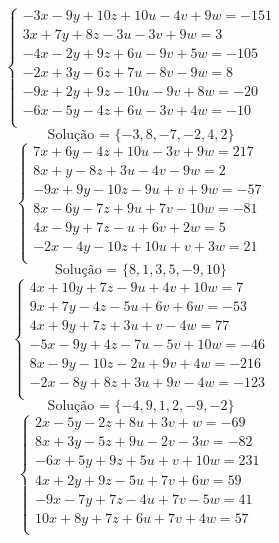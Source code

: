 \documentclass[12pt,oneside,a4paper]{article}
\begin{document}
\vspace{\baselineskip}
\begin{equation*}
\begin{cases}
-3x-9y+10z+10u-4v+9w=-151 \\
3x+7y+8z-3u-3v+9w=3 \\
-4x-2y+9z+6u-9v+5w=-105 \\
-2x+3y-6z+7u-8v-9w=8 \\
-9x+2y+9z-10u-9v+8w=-20 \\
-6x-5y-4z+6u-3v+4w=-10 \\
\end{cases}
\end{equation*}
\begin{equation*}
\text{Solução = }\{-3,8,-7,-2,4,2\}
\end{equation*}
\vspace{\baselineskip}
\begin{equation*}
\begin{cases}
7x+6y-4z+10u-3v+9w=217 \\
8x+y-8z+3u-4v-9w=2 \\
-9x+9y-10z-9u+v+9w=-57 \\
8x-6y-7z+9u+7v-10w=-81 \\
4x-9y+7z-u+6v+2w=5 \\
-2x-4y-10z+10u+v+3w=21 \\
\end{cases}
\end{equation*}
\begin{equation*}
\text{Solução = }\{8,1,3,5,-9,10\}
\end{equation*}
\vspace{\baselineskip}
\begin{equation*}
\begin{cases}
4x+10y+7z-9u+4v+10w=7 \\
9x+7y-4z-5u+6v+6w=-53 \\
4x+9y+7z+3u+v-4w=77 \\
-5x-9y+4z-7u-5v+10w=-46 \\
8x-9y-10z-2u+9v+4w=-216 \\
-2x-8y+8z+3u+9v-4w=-123 \\
\end{cases}
\end{equation*}
\begin{equation*}
\text{Solução = }\{-4,9,1,2,-9,-2\}
\end{equation*}
\vspace{\baselineskip}
\begin{equation*}
\begin{cases}
2x-5y-2z+8u+3v+w=-69 \\
8x+3y-5z+9u-2v-3w=-82 \\
-6x+5y+9z+5u+v+10w=231 \\
4x+2y+9z-5u+7v+6w=59 \\
-9x-7y+7z-4u+7v-5w=41 \\
10x+8y+7z+6u+7v+4w=57 \\
\end{cases}
\end{equation*}
\end{document}
